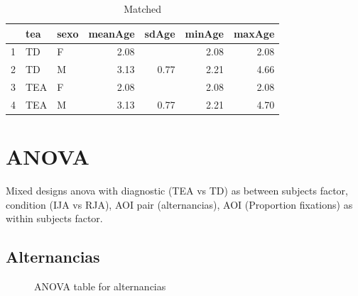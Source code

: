 \documentclass{article}
\begin{document}
\begin{table}[H]
\caption{Matched}
\centering
\begin{tabular}{rllrrrr}
  \hline
  & tea & sexo & meanAge & sdAge & minAge & maxAge \\ 
  \hline
  1 & TD & F & 2.08 &  & 2.08 & 2.08 \\ 
  2 & TD & M & 3.13 & 0.77 & 2.21 & 4.66 \\ 
  3 & TEA & F & 2.08 &  & 2.08 & 2.08 \\ 
  4 & TEA & M & 3.13 & 0.77 & 2.21 & 4.70 \\ 
   \hline
\end{tabular}
\end{table}

\section{ANOVA}

Mixed designs anova with diagnostic (TEA vs TD) as between subjects factor, condition (IJA vs RJA), AOI pair (alternancias), AOI (Proportion fixations) as within subjects factor.

\subsection{Alternancias}

\begin{figure}[H]
  \caption{ANOVA table for alternancias}
  \noindent{}
  \centering
\end{figure}
\end{document}
